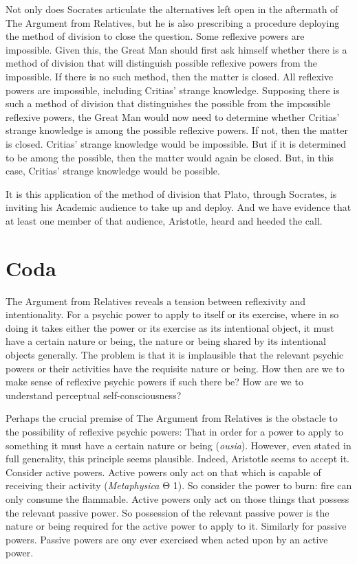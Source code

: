 Not only does Socrates articulate the alternatives left open in the aftermath of The Argument from Relatives, but he is also prescribing a procedure deploying the method of division to close the question. Some reflexive powers are impossible. Given this, the Great Man should first ask himself whether there is a method of division that will distinguish possible reflexive powers from the impossible. If there is no such method, then the matter is closed. All reflexive powers are impossible, including Critias' strange knowledge. Supposing there is such a method of division that distinguishes the possible from the impossible reflexive powers, the Great Man would now need to determine whether Critias' strange knowledge is among the possible reflexive powers. If not, then the matter is closed. Critias' strange knowledge would be impossible. But if it is determined to be among the possible, then the matter would again be closed. But, in this case, Critias' strange knowledge would be possible.

It is this application of the method of division that Plato, through Socrates, is inviting his Academic audience to take up and deploy. And we have evidence that at least one member of that audience, Aristotle, heard and heeded the call.


\section{Coda} %
\label{sec:coda}

The Argument from Relatives reveals a tension between reflexivity and intentionality. For a psychic power to apply to itself or its exercise, where in so doing it takes either the power or its exercise as its intentional object, it must have a certain nature or being, the nature or being shared by its intentional objects generally. The problem is that it is implausible that the relevant psychic powers or their activities have the requisite nature or being. How then are we to make sense of reflexive psychic powers if such there be? How are we to understand perceptual self-consciousness?

Perhaps the crucial premise of The Argument from Relatives is the obstacle to the possibility of reflexive psychic powers: That in order for a power to apply to something it must have a certain nature or being (\emph{ousia}). However, even stated in full generality, this principle seems plausible. Indeed, Aristotle seems to accept it. Consider active powers. Active powers only act on that which is capable of receiving their activity (\emph{Metaphysica} {\sbl Θ} 1). So consider the power to burn: fire can only consume the flammable. Active powers only act on those things that possess the relevant passive power. So possession of the relevant passive power is the nature or being required for the active power to apply to it. Similarly for passive powers. Passive powers are ony ever exercised when acted upon by an active power.

